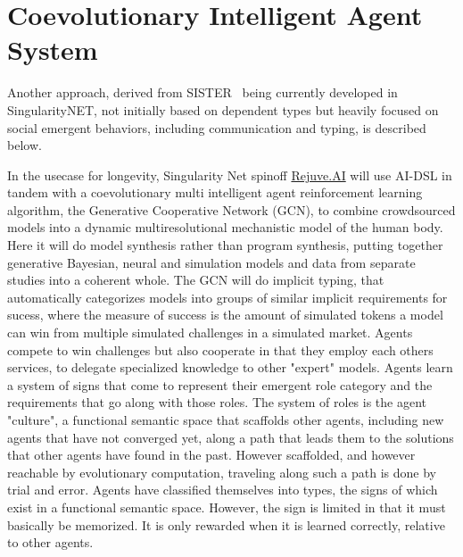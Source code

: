 \documentclass[]{report}
\begin{document}
\section{Coevolutionary Intelligent Agent System}

Another approach, derived from SISTER~\cite{Duong2004} being currently
developed in SingularityNET, not initially based on dependent types
but heavily focused on social emergent behaviors, including
communication and typing, is described below.

In the usecase for longevity, Singularity Net spinoff
\href{https://rejuve.ai/}{Rejuve.AI} will use AI-DSL in tandem with a
coevolutionary multi intelligent agent reinforcement learning
algorithm, the Generative Cooperative Network (GCN), to combine
crowdsourced models into a dynamic multiresolutional mechanistic model
of the human body.  Here it will do model synthesis rather than
program synthesis, putting together generative Bayesian, neural and
simulation models and data from separate studies into a coherent
whole.  The GCN will do implicit typing, that automatically
categorizes models into groups of similar implicit requirements for
sucess, where the measure of success is the amount of simulated tokens
a model can win from multiple simulated challenges in a simulated
market. Agents compete to win challenges but also cooperate in that
they employ each others services, to delegate specialized knowledge to
other "expert" models. Agents learn a system of signs that come to
represent their emergent role category and the requirements that go
along with those roles.  The system of roles is the agent "culture", a
functional semantic space that scaffolds other agents, including new
agents that have not converged yet, along a path that leads them to
the solutions that other agents have found in the past. However
scaffolded, and however reachable by evolutionary computation,
traveling along such a path is done by trial and error. Agents have
classified themselves into types, the signs of which exist in a
functional semantic space. However, the sign is limited in that it
must basically be memorized. It is only rewarded when it is learned
correctly, relative to other agents.
\end{document}
